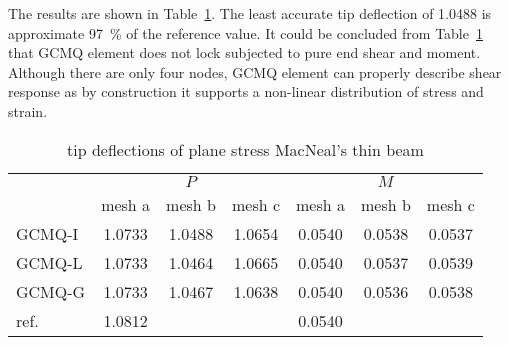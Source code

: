 \documentclass[3p,sort&compress,review,11pt]{elsarticle}
\newcommand*{\tabref}[1]{Table~\ref{#1}}
\begin{document}
The results are shown in \tabref{table:macneals_beam_shear}. The least accurate tip deflection of \num{1.0488} is approximate \SI{97}{\percent} of the reference value. It could be concluded from \tabref{table:macneals_beam_shear} that GCMQ element does not lock subjected to pure end shear and moment. Although there are only four nodes, GCMQ element can properly describe shear response as by construction it supports a non-linear distribution of stress and strain.
\begin{table}[H]
\centering\scriptsize
\caption{tip deflections of plane stress MacNeal's thin beam}\label{table:macneals_beam_shear}
\begin{tabular}{lcccccc}
	\toprule
	                      & \multicolumn{3}{c}{$P$}  & \multicolumn{3}{c}{$M$}  \\
	                      & mesh a & mesh b & mesh c & mesh a & mesh b & mesh c \\ \midrule
	GCMQ-I                & 1.0733 & 1.0488 & 1.0654 & 0.0540 & 0.0538 & 0.0537 \\
	GCMQ-L                & 1.0733 & 1.0464 & 1.0665 & 0.0540 & 0.0537 & 0.0539 \\
	GCMQ-G                & 1.0733 & 1.0467 & 1.0638 & 0.0540 & 0.0536 & 0.0538 \\ \midrule
	ref. \citep{Cen2015} & 1.0812 &        &        & 0.0540 &        &        \\ \bottomrule
\end{tabular}
\end{table}
\end{document}
